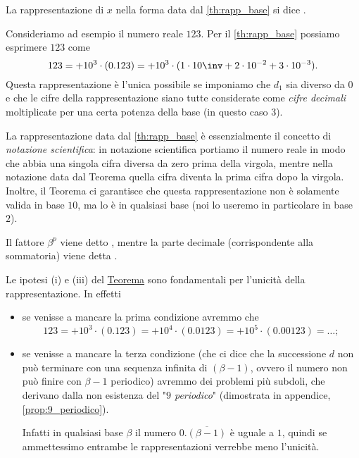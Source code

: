 La rappresentazione di $x$ nella forma data dal \autoref{th:rapp_base} si dice .

\begin{example}
    Consideriamo ad esempio il numero reale $123$. Per il \autoref{th:rapp_base} possiamo esprimere $123$ come \[
        123 = +10^3 \cdot (0.123) = + 10^3 \cdot (1 \cdot 10\inv + 2 \cdot 10^{-2} + 3 \cdot 10^{-3}).
    \] Questa rappresentazione è l'unica possibile se imponiamo che $d_1$ sia diverso da $0$ e che le cifre della rappresentazione siano tutte considerate come \emph{cifre decimali} moltiplicate per una certa potenza della base (in questo caso $3$).
\end{example}

La rappresentazione data dal \autoref{th:rapp_base} è essenzialmente il concetto di \emph{notazione scientifica}: in notazione scientifica portiamo il numero reale in modo che abbia una singola cifra diversa da zero prima della virgola, mentre nella notazione data dal Teorema quella cifra diventa la prima cifra dopo la virgola. 
Inoltre, il Teorema ci garantisce che questa rappresentazione non è solamente valida in base $10$, ma lo è in qualsiasi base (noi lo useremo in particolare in base $2$).

Il fattore $\beta^p$ viene detto , mentre la parte decimale (corrispondente alla sommatoria) viene detta . 

\begin{remark} 
    Le ipotesi (i) e (iii) del \hyperref[th:rapp_base]{Teorema} sono fondamentali per l'unicità della rappresentazione. In effetti
    \begin{itemize}
        \item se venisse a mancare la prima condizione avremmo che \[
            123 = +10^3 \cdot (0.123) = +10^4 \cdot (0.0123) = +10^5 \cdot (0.00123) = \dots;
        \]
        \item se venisse a mancare la terza condizione 
        (che ci dice che la successione $d$ non può terminare con una sequenza infinita di $(\beta - 1)$, ovvero il numero non può finire con $\beta-1$ periodico) 
        avremmo dei problemi più subdoli, che derivano dalla non esistenza del "\emph{$9$ periodico}" (dimostrata in appendice, \autoref{prop:9_periodico}). 
        
        Infatti in qualsiasi base $\beta$ il numero $0.\overline{(\beta-1)}$ è uguale a $1$, quindi se ammettessimo entrambe le rappresentazioni verrebbe meno l'unicità.
    \end{itemize}
\end{remark}

